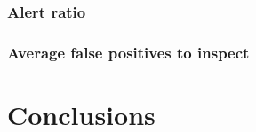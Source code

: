\documentclass{article}
\begin{document}
\subsubsection{Alert ratio}
\subsubsection{Average false positives to inspect}









\section{Conclusions}




\end{document}
